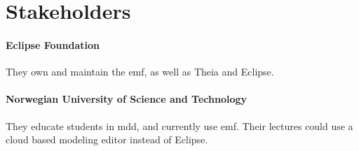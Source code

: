 \section{Stakeholders}

\paragraph*{Eclipse Foundation} They own and maintain the \acrlong{emf}, as well as \gls{Theia} and \gls{Eclipse}.

\paragraph*{Norwegian University of Science and Technology} They educate students in \acrlong{mdd}, and currently use \acrshort{emf}. Their lectures could use a cloud based modeling editor instead of \gls{Eclipse}.

